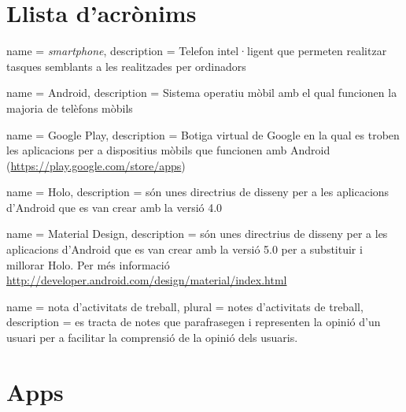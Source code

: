 \chapter*{Llista d'acrònims}
\label{sec:glossary}


\begin{acronym}
\end{acronym}




{
name = \textit{smartphone}, description = Telefon intel·ligent que permeten realitzar tasques semblants a les realitzades per ordinadors 
}

{
name = Android, description = Sistema operatiu mòbil amb el qual funcionen la majoria de telèfons mòbils \cite{Android_OS}
}

{
name = Google Play, description = Botiga virtual de Google en la qual es troben les aplicacions per a dispositius mòbils que funcionen amb \gls{Android} (\url{https://play.google.com/store/apps})
}

{
name = Holo, description = són unes directrius de disseny per a les aplicacions d'\gls{Android} que es van crear amb la versió 4.0
}

{
name = Material Design, description = són unes directrius de disseny per a les aplicacions d'Android que es van crear amb la versió 5.0 per a substituir i millorar Holo. Per més informació \url{http://developer.android.com/design/material/index.html}
}

{
name = nota d'activitats de treball, plural = notes d'activitats de treball, description = es tracta de notes que parafrasegen i representen la opinió d'un usuari per a facilitar la comprensió de la opinió dels usuaris.  
}

\printglossary


\chapter*{Apps}
\label{sec:apps}

